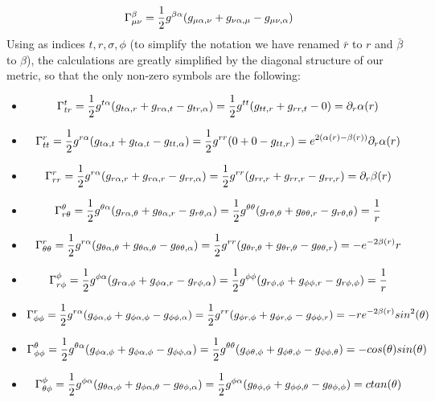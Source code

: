 \documentclass[]{article}
\theoremstyle{definition}
\theoremstyle{Theorem}
\theoremstyle{definition}
\theoremstyle{definition}
\theoremstyle{definition}
\begin{document}
$$\Gamma_{\mu\nu}^\beta={1\over 2}g^{\beta\alpha}(g_{\mu\alpha,\nu}+g_{\nu\alpha,\mu}-g_{\mu\nu,\alpha})$$
Using as indices ${t,r,\sigma,\phi}$ (to simplify the notation we have renamed $\bar{r}$ to $r$ and $\bar{\beta}$ to $\beta$), the calculations are greatly simplified by the diagonal structure of our metric, so that the only non-zero symbols are the following:\\
\begin{itemize}
	\item $$\Gamma_{tr}^t={1\over 2}g^{t\alpha}(g_{t\alpha,r}+g_{r\alpha,t}-g_{tr,\alpha})={1\over 2}g^{tt}(g_{tt,r}+g_{rr,t}-0)=\partial_r\alpha(r)$$
	\item $$\Gamma_{tt}^r={1\over 2}g^{r\alpha}(g_{t\alpha,t}+g_{t\alpha,t}-g_{tt,\alpha})={1\over 2}g^{rr}(0+0-g_{tt,r})=e^{2(\alpha(r)-\beta(r))}\partial_r\alpha(r)$$
	\item $$\Gamma_{rr}^r={1\over 2}g^{r\alpha}(g_{r\alpha,r}+g_{r\alpha,r}-g_{rr,\alpha})={1\over 2}g^{rr}(g_{rr,r}+g_{rr,r}-g_{rr,r})=\partial_r\beta(r)$$
	\item $$\Gamma_{r\theta}^\theta={1\over 2}g^{\theta\alpha}(g_{r\alpha,\theta}+g_{\theta\alpha,r}-g_{r\theta,\alpha})={1\over 2}g^{\theta\theta}(g_{r\theta,\theta}+g_{\theta\theta,r}-g_{r\theta,\theta})={1\over r}$$
	\item $$\Gamma_{\theta\theta}^r={1\over 2}g^{r\alpha}(g_{\theta\alpha,\theta}+g_{\theta\alpha,\theta}-g_{\theta\theta,\alpha})={1\over 2}g^{rr}(g_{\theta r,\theta}+g_{\theta r,\theta}-g_{\theta\theta,r})=-e^{-2\beta(r)}r$$
	\item $$\Gamma_{r\phi}^\phi={1\over 2}g^{\phi\alpha}(g_{r\alpha,\phi}+g_{\phi\alpha,r}-g_{r\phi,\alpha})={1\over 2}g^{\phi\phi}(g_{r\phi,\phi}+g_{\phi\phi,r}-g_{r\phi,\phi})={1\over r}$$
	\item $$\Gamma_{\phi\phi}^r={1\over 2}g^{r\alpha}(g_{\phi\alpha,\phi}+g_{\phi\alpha,\phi}-g_{\phi\phi,\alpha})={1\over 2}g^{rr}(g_{\phi r,\phi}+g_{\phi r,\phi}-g_{\phi\phi,r})=-re^{-2\beta(r)}sin^2(\theta)$$
	\item $$\Gamma_{\phi\phi}^\theta={1\over 2}g^{\theta\alpha}(g_{\phi\alpha,\phi}+g_{\phi\alpha,\phi}-g_{\phi\phi,\alpha})={1\over 2}g^{\theta\theta}(g_{\phi\theta,\phi}+g_{\phi\theta,\phi}-g_{\phi\phi,\theta})=-cos(\theta)sin(\theta)$$
	\item $$\Gamma_{\theta\phi}^\phi={1\over 2}g^{\phi\alpha}(g_{\theta\alpha,\phi}+g_{\phi\alpha,\theta}-g_{\theta\phi,\alpha})={1\over 2}g^{\phi\alpha}(g_{\theta\phi,\phi}+g_{\phi\phi,\theta}-g_{\theta\phi,\phi})=ctan(\theta)$$
\end{itemize}
\end{document}
